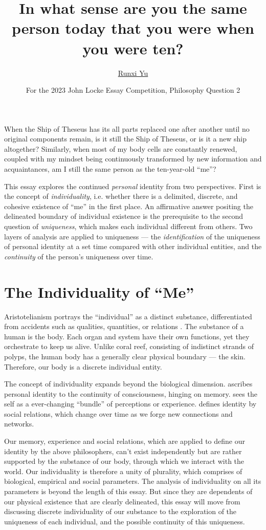 \documentclass[a4paper,english,12pt]{scrartcl}
\title{In what sense are you the same person today that you were when you were ten?}
\author{\href{https://www.andrewyu.org/}{Runxi Yu}}
\date{For the 2023 John Locke Essay Competition, Philosophy Question 2}
\begin{document}
\maketitle

\noindent When the Ship of Theseus has its all parts replaced one
after another until no original components remain, is it still the
Ship of Theseus, or is it a new ship altogether?  Similarly, when
most of my body cells are constantly renewed, coupled with my mindset
being continuously transformed by new information and acquaintances,
am I still the same person as the ten-year-old ``me''?

This essay explores the continued \emph{personal} identity from two
perspectives. First is the concept of \emph{individuality}, i.e. whether
there is a delimited, discrete, and cohesive existence of ``me''
in the first place. An affirmative answer positing the delineated
boundary of individual existence is the prerequisite to the second
question of \emph{uniqueness}, which makes each individual different
from others. Two layers of analysis are applied to uniqueness
--- the \emph{identification} of the uniqueness of personal identity
at a set time compared with other individual entities, and the \emph{continuity}
of the person's uniqueness over time.

\section{The Individuality of ``Me''}

Aristotelianism portrays the ``individual'' as a distinct substance,
differentiated from accidents such as qualities, quantities, or relations
\parencite{MetaphysicsZeta}. The substance of a human is the body.
Each organ and system have their own functions, yet they orchestrate
to keep us alive. Unlike coral reef, consisting of indistinct strands
of polyps, the human body has a generally clear physical boundary
--- the skin. Therefore, our body is a discrete individual
entity.

The concept of individuality expands beyond the biological dimension.
\textcite{LockeHumanUnderstanding} ascribes personal identity to
the continuity of consciousness, hinging on memory. \textcite{DavidHume} sees the self
as a ever-changing “bundle” of perceptions or experience. \textcite{Mead1934MindSA} defines identity by social relations,
which change over time as we forge new connections and networks.

Our memory, experience and social relations, which are applied to
define our identity by the above philosophers, can't exist independently
but are rather supported by the substance of our body, through which we interact
with the world. Our individuality is therefore a unity of plurality,
which comprises of biological, empirical and social parameters. The analysis of individuality
on all its parameters is beyond the length of this essay. But since
they are dependents of our physical existence that are clearly delineated,
this essay will move from discussing discrete individuality of our
substance to the exploration of the uniqueness of each individual,
and the possible continuity of this uniqueness.
\end{document}
